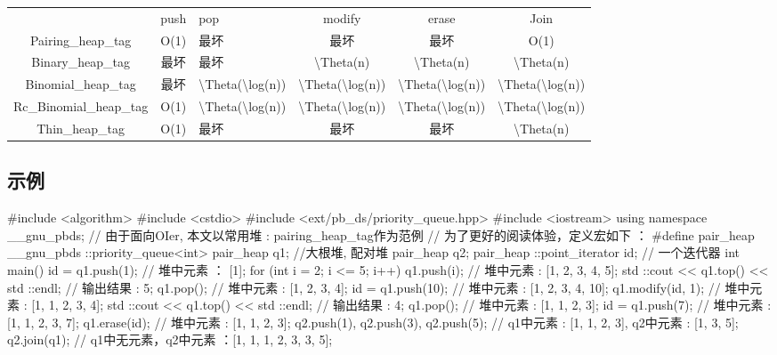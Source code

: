 \begin{tabular}{cclccc}
\hline
 & push& pop& modify& erase& Join\\Pairing\_heap\_tag& O(1)& 最坏& 最坏& 最坏& O(1)\\Binary\_heap\_tag& 最坏& 最坏& \textbackslash{}Theta(n)& \textbackslash{}Theta(n)& \textbackslash{}Theta(n)\\Binomial\_heap\_tag& 最坏& \textbackslash{}Theta(\textbackslash{}log(n))& \textbackslash{}Theta(\textbackslash{}log(n))& \textbackslash{}Theta(\textbackslash{}log(n))& \textbackslash{}Theta(\textbackslash{}log(n))\\Rc\_Binomial\_heap\_tag& O(1)& \textbackslash{}Theta(\textbackslash{}log(n))& \textbackslash{}Theta(\textbackslash{}log(n))& \textbackslash{}Theta(\textbackslash{}log(n))& \textbackslash{}Theta(\textbackslash{}log(n))\\Thin\_heap\_tag& O(1)& 最坏& 最坏& 最坏& \textbackslash{}Theta(n)\\\hline
\end{tabular}

\subsection{示例}

\begin{cppcode}
#include <algorithm>
#include <cstdio>
#include <ext/pb_ds/priority_queue.hpp>
#include <iostream>
using namespace __gnu_pbds;
// 由于面向OIer, 本文以常用堆 : pairing_heap_tag作为范例
// 为了更好的阅读体验，定义宏如下 ：
#define pair_heap __gnu_pbds ::priority_queue<int>
pair_heap q1;  //大根堆, 配对堆
pair_heap q2;
pair_heap ::point_iterator id;  // 一个迭代器
int main() {
  id = q1.push(1);
  // 堆中元素 ： [1];
  for (int i = 2; i <= 5; i++) q1.push(i);
  // 堆中元素 :  [1, 2, 3, 4, 5];
  std ::cout << q1.top() << std ::endl;
  // 输出结果 : 5;
  q1.pop();
  // 堆中元素 : [1, 2, 3, 4];
  id = q1.push(10);
  // 堆中元素 : [1, 2, 3, 4, 10];
  q1.modify(id, 1);
  // 堆中元素 :  [1, 1, 2, 3, 4];
  std ::cout << q1.top() << std ::endl;
  // 输出结果 : 4;
  q1.pop();
  // 堆中元素 : [1, 1, 2, 3];
  id = q1.push(7);
  // 堆中元素 : [1, 1, 2, 3, 7];
  q1.erase(id);
  // 堆中元素 : [1, 1, 2, 3];
  q2.push(1), q2.push(3), q2.push(5);
  // q1中元素 : [1, 1, 2, 3], q2中元素 : [1, 3, 5];
  q2.join(q1);
  // q1中无元素，q2中元素 ：[1, 1, 1, 2, 3, 3, 5];
}
\end{cppcode}
